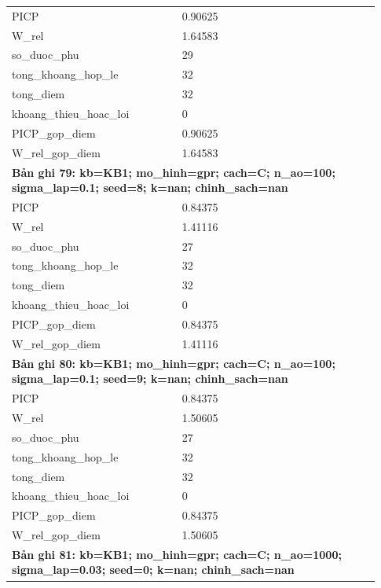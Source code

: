 \begin{longtable}{p{0.43\linewidth}p{0.50\linewidth}}
PICP & 0.90625 \\
W\_\allowbreak rel & 1.64583 \\
so\_\allowbreak duoc\_\allowbreak phu & 29 \\
tong\_\allowbreak khoang\_\allowbreak hop\_\allowbreak le & 32 \\
tong\_\allowbreak diem & 32 \\
khoang\_\allowbreak thieu\_\allowbreak hoac\_\allowbreak loi & 0 \\
PICP\_\allowbreak gop\_\allowbreak diem & 0.90625 \\
W\_\allowbreak rel\_\allowbreak gop\_\allowbreak diem & 1.64583 \\
\midrule
\multicolumn{2}{p{0.95\linewidth}}{\textbf{Bản ghi 79: kb=KB1; mo\_hinh=gpr; cach=C; n\_ao=100; sigma\_lap=0.1; seed=8; k=nan; chinh\_sach=nan}} \\
PICP & 0.84375 \\
W\_\allowbreak rel & 1.41116 \\
so\_\allowbreak duoc\_\allowbreak phu & 27 \\
tong\_\allowbreak khoang\_\allowbreak hop\_\allowbreak le & 32 \\
tong\_\allowbreak diem & 32 \\
khoang\_\allowbreak thieu\_\allowbreak hoac\_\allowbreak loi & 0 \\
PICP\_\allowbreak gop\_\allowbreak diem & 0.84375 \\
W\_\allowbreak rel\_\allowbreak gop\_\allowbreak diem & 1.41116 \\
\midrule
\multicolumn{2}{p{0.95\linewidth}}{\textbf{Bản ghi 80: kb=KB1; mo\_hinh=gpr; cach=C; n\_ao=100; sigma\_lap=0.1; seed=9; k=nan; chinh\_sach=nan}} \\
PICP & 0.84375 \\
W\_\allowbreak rel & 1.50605 \\
so\_\allowbreak duoc\_\allowbreak phu & 27 \\
tong\_\allowbreak khoang\_\allowbreak hop\_\allowbreak le & 32 \\
tong\_\allowbreak diem & 32 \\
khoang\_\allowbreak thieu\_\allowbreak hoac\_\allowbreak loi & 0 \\
PICP\_\allowbreak gop\_\allowbreak diem & 0.84375 \\
W\_\allowbreak rel\_\allowbreak gop\_\allowbreak diem & 1.50605 \\
\midrule
\multicolumn{2}{p{0.95\linewidth}}{\textbf{Bản ghi 81: kb=KB1; mo\_hinh=gpr; cach=C; n\_ao=1000; sigma\_lap=0.03; seed=0; k=nan; chinh\_sach=nan}} \\

\end{longtable}
